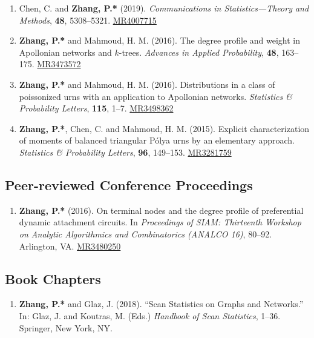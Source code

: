 \documentclass[margin]{res}
\def\MR#1{\href{http://www.ams.org/mathscinet-getitem?mr=#1}{MR#1}}
\begin{document}
\begin{resume}
\begin{enumerate}
	profile and Gini index of random caterpillar trees. {\em 
	Probability in Engineering and Informational Sciences}, 
	\textbf{33}, 511--527. \MR{4010508}
	\item {\sc Chen, C.} and {\bf Zhang, P.*} (2019). {\em 
	Communications in Statistics---Theory and Methods}, \textbf{48}, 
	5308--5321. \MR{4007715}
	\item {\bf Zhang, P.*} and {\sc Mahmoud, H. M.} (2016). The 
	degree profile and weight in Apollonian networks and $k$-trees. 
	\emph{Advances in Applied Probability}, \textbf{48}, 163--175. 
	\MR{3473572}
	\item {\bf Zhang, P.*} and {\sc Mahmoud, H. M.} (2016). 
	Distributions in a class of poissonized urns with an application 
	to Apollonian networks. \emph{Statistics \& Probability 
	Letters}, {\bf 115}, 1--7. \MR{3498362}
	\item {\bf Zhang, P.*}, {\sc Chen, C.} and {\sc Mahmoud, H. M.} 
	(2015). Explicit characterization of moments of balanced 
	triangular P\'{o}lya urns by an elementary approach. 
	\emph{Statistics \& Probability Letters}, {\bf 96}, 149--153. 
	\MR{3281759}
\end{enumerate} 

\subsection{Peer-reviewed Conference Proceedings}
\begin{enumerate}
	\item {\bf Zhang, P.*} (2016). On terminal nodes and the degree 
	profile of preferential dynamic attachment circuits. In 
	\emph{Proceedings of SIAM: Thirteenth Workshop on Analytic 
	Algorithmics and Combinatorics (ANALCO 16)}, 80--92. Arlington, 
	VA. \MR{3480250}
\end{enumerate}

\subsection{Book Chapters}
\begin{enumerate}
	\item {\bf Zhang, P.*} and {\sc Glaz, J.} (2018). ``Scan 
	Statistics on Graphs and Networks.'' In: Glaz, J. and Koutras, 
	M. (Eds.) {\em Handbook of Scan Statistics}, 1--36. Springer, 
	New York, NY. 
\end{enumerate}


\end{resume}
\end{document}
